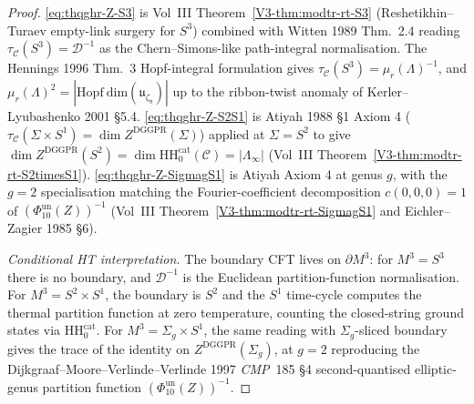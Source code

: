 \begin{proof}
\eqref{eq:thqghr-Z-S3} is Vol~III Theorem~\ref{V3-thm:modtr-rt-S3}
(Reshetikhin--Turaev empty-link surgery for $S^3$) combined with
Witten 1989 Thm.~2.4 reading $\tau_{\mathcal C}(S^3) = \mathcal D^{-1}$
as the Chern--Simons-like path-integral normalisation. The
Hennings 1996 Thm.~3 Hopf-integral formulation gives
$\tau_{\mathcal C}(S^3) = \mu_r(\Lambda)^{-1}$, and
$\mu_r(\Lambda)^2 = |\mathrm{Hopf\ dim}(\mathfrak u_{\zeta_8})|$ up
to the ribbon-twist anomaly of Kerler--Lyubashenko 2001 \S 5.4.
\eqref{eq:thqghr-Z-S2S1} is Atiyah 1988 \S 1 Axiom 4
($\tau_{\mathcal C}(\Sigma\times S^1) = \dim Z^{\mathrm{DGGPR}}(\Sigma)$)
applied at $\Sigma = S^2$ to give
$\dim Z^{\mathrm{DGGPR}}(S^2) = \dim\mathrm{HH}_0^{\mathrm{cat}}
(\mathcal C) = |\Lambda_\infty|$ (Vol~III
Theorem~\ref{V3-thm:modtr-rt-S2timesS1}). \eqref{eq:thqghr-Z-SigmagS1}
is Atiyah Axiom 4 at genus $g$, with the $g = 2$ specialisation
matching the Fourier-coefficient decomposition $c(0, 0, 0) = 1$ of
$(\Phi_{10}^{\mathrm{un}}(Z))^{-1}$ (Vol~III Theorem~\ref{V3-thm:modtr-rt-SigmagS1}
and Eichler--Zagier 1985 \S 6).

\emph{Conditional HT interpretation.} The boundary CFT lives on
$\partial M^3$: for $M^3 = S^3$ there is no boundary, and
$\mathcal D^{-1}$ is the Euclidean partition-function
normalisation. For $M^3 = S^2\times S^1$, the boundary is
$S^2$ and the $S^1$ time-cycle computes the thermal partition
function at zero temperature, counting the closed-string
ground states via $\mathrm{HH}_0^{\mathrm{cat}}$. For $M^3 =
\Sigma_g\times S^1$, the same reading with $\Sigma_g$-sliced
boundary gives the trace of the identity on
$Z^{\mathrm{DGGPR}}(\Sigma_g)$, at $g = 2$ reproducing the
Dijkgraaf--Moore--Verlinde--Verlinde 1997 \emph{CMP}~185 \S 4
second-quantised elliptic-genus partition function
$(\Phi_{10}^{\mathrm{un}}(Z))^{-1}$.
\end{proof}

